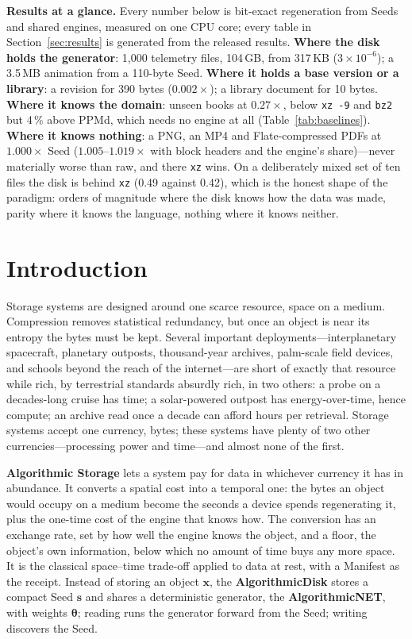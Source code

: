 \documentclass[11pt,a4paper]{article}
\theoremstyle{definition}
\theoremstyle{plain}
\theoremstyle{remark}
\newcommand{\ANET}{\textbf{AlgorithmicNET}}
\newcommand{\ADISK}{\textbf{AlgorithmicDisk}}
\newcommand{\ASTOR}{\textbf{Algorithmic Storage}}
\newcommand{\seed}{\mathbf{s}}
\newcommand{\weights}{\bm{\theta}}
\newcommand{\file}{\mathbf{x}}
\begin{document}
\begin{keyinsight}
\textbf{Results at a glance.} Every number below is bit-exact regeneration from Seeds and
shared engines, measured on one CPU core; every table in Section~\ref{sec:results} is
generated from the released results. \textbf{Where the disk holds the generator}: 1,000
telemetry files, 104\,GB, from 317\,KB ($3\times10^{-6}$); a 3.5\,MB animation from a 110-byte
Seed. \textbf{Where it holds a base version or a library}: a revision for 390 bytes
($0.002\times$); a library document for 10 bytes. \textbf{Where it knows the domain}: unseen
books at $0.27\times$, below \texttt{xz -9} and \texttt{bz2} but 4\,\% above PPMd, which needs
no engine at all (Table~\ref{tab:baselines}). \textbf{Where it knows nothing}: a PNG, an MP4 and
Flate-compressed PDFs at $1.000\times$ Seed ($1.005$--$1.019\times$ with block headers and the
engine's share)---never materially worse than raw, and there \texttt{xz} wins. On a deliberately mixed set of
ten files the disk is behind \texttt{xz} (0.49 against 0.42), which is the honest shape of the
paradigm: orders of magnitude where the disk knows how the data was made, parity where it knows
the language, nothing where it knows neither.
\end{keyinsight}

\section{Introduction}
Storage systems are designed around one scarce resource, space on a medium. Compression
\citep{shannon1948} removes statistical redundancy, but once an object is near its entropy the
bytes must be kept. Several important deployments---interplanetary spacecraft, planetary
outposts, thousand-year archives, palm-scale field devices, and schools beyond the reach of the
internet---are short of exactly that resource while rich, by terrestrial standards absurdly rich,
in two others: a probe on a decades-long cruise has time; a solar-powered outpost has
energy-over-time, hence compute; an archive read once a decade can afford hours per retrieval.
Storage systems accept one currency, bytes; these systems have plenty of two other
currencies---processing power and time---and almost none of the first.

\ASTOR{} lets a system pay for data in whichever currency it has in abundance. It converts a
spatial cost into a temporal one: the bytes an object would occupy on a
medium become the seconds a device spends regenerating it, plus the one-time cost of the engine
that knows how. The conversion has an exchange rate, set by how well the engine knows the object,
and a floor, the object's own information, below which no amount of time buys any more space. It
is the classical space--time trade-off \citep{hellman1980,chen2016checkpoint} applied to data at
rest, with a Manifest as the receipt. Instead of storing an object $\file$, the \ADISK{} stores a
compact Seed $\seed$ and shares a deterministic generator, the \ANET{}, with weights $\weights$;
reading runs the generator forward from the Seed; writing discovers the Seed.
\end{document}
